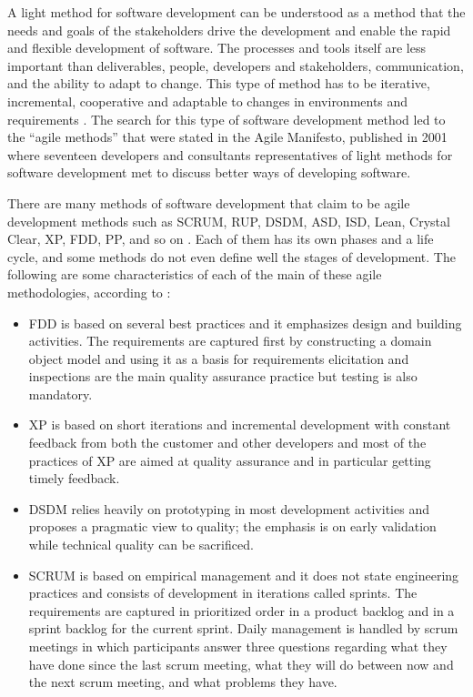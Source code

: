 A light method for software development can be understood as a method that the needs and goals of the stakeholders drive the development and enable the rapid and flexible development of software. The processes and tools itself are less important than deliverables, people, developers and stakeholders, communication, and the ability to adapt to change. This type of method has to be iterative, incremental, cooperative and adaptable to changes in environments and requirements \cite{Abdelouhab2014,Chehili2013,Farroha2011}. The search for this type of software development method led to the “agile methods” that were stated in the Agile Manifesto, published in 2001 \cite{alliance2001agile} where seventeen developers and consultants representatives of light methods for software development met to discuss better ways of developing software.

There are many methods of software development that claim to be agile development methods such as SCRUM, \acrfull{RUP}, \acrfull{DSDM}, \acrfull{ASD}, \acrfull{ISD}, Lean, Crystal Clear, \acrfull{XP}, \acrfull{FDD}, \acrfull{PP}, and so on \cite{Carvalho2013,INAYAT2015915,Highsmith2001Agile,DYBA2008833,VallonSLRAgile2018,Timperi2004}. Each of them has its own phases and a life cycle, and some methods do not even define well the stages of development. The following are some characteristics of each of the main of these agile methodologies, according to \citet{Timperi2004}:
\begin{itemize}
\item \acrfull{FDD} is based on several best practices and it emphasizes design and building activities. The requirements are captured first by constructing a domain object model and using it as a basis for requirements elicitation and inspections are the main quality assurance practice but testing is also mandatory.
\item \acrfull{XP} is based on short iterations and incremental development with constant feedback from both the customer and other developers and most of the practices of XP are aimed at quality assurance and in particular getting timely feedback.
\item \acrfull{DSDM} relies heavily on prototyping in most development activities and proposes a pragmatic view to quality; the emphasis is on early validation while technical quality can be sacrificed.
\item SCRUM is based on empirical management and it does not state engineering practices and consists of development in iterations called sprints. The requirements are captured in prioritized order in a product backlog and in a sprint backlog for the current sprint. Daily management is handled by scrum meetings in which participants answer three questions regarding what they have done since the last scrum meeting, what they will do between now and the next scrum meeting, and what problems they have.
\end{itemize}



